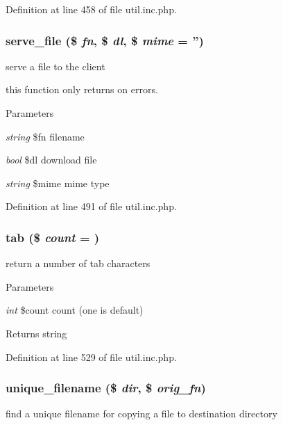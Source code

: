 Definition at line 458 of file util.inc.php.

\hypertarget{util_8inc_8php_a43278b320bd522e46bd7abdd3a2f6fb0}{
\subsubsection[{serve\_\-file}]{\setlength{\rightskip}{0pt plus 5cm}serve\_\-file (\$ {\em fn}, \/  \$ {\em dl}, \/  \$ {\em mime} = {\ttfamily ''})}}
\label{util_8inc_8php_a43278b320bd522e46bd7abdd3a2f6fb0}
serve a file to the client

this function only returns on errors. 
\begin{DoxyParams}{Parameters}
\item[{\em string}]\$fn filename \item[{\em bool}]\$dl download file \item[{\em string}]\$mime mime type \end{DoxyParams}


Definition at line 491 of file util.inc.php.

\hypertarget{util_8inc_8php_a74e38925e7162356a2ea14db32664c37}{
\subsubsection[{tab}]{\setlength{\rightskip}{0pt plus 5cm}tab (\$ {\em count} = {})}}
\label{util_8inc_8php_a74e38925e7162356a2ea14db32664c37}
return a number of tab characters


\begin{DoxyParams}{Parameters}
\item[{\em int}]\$count count (one is default) \end{DoxyParams}
\begin{DoxyReturn}{Returns}
string 
\end{DoxyReturn}


Definition at line 529 of file util.inc.php.

\hypertarget{util_8inc_8php_a187670bae118aa2d4864c513a21e712d}{
\subsubsection[{unique\_\-filename}]{\setlength{\rightskip}{0pt plus 5cm}unique\_\-filename (\$ {\em dir}, \/  \$ {\em orig\_\-fn})}}
\label{util_8inc_8php_a187670bae118aa2d4864c513a21e712d}
find a unique filename for copying a file to destination directory


